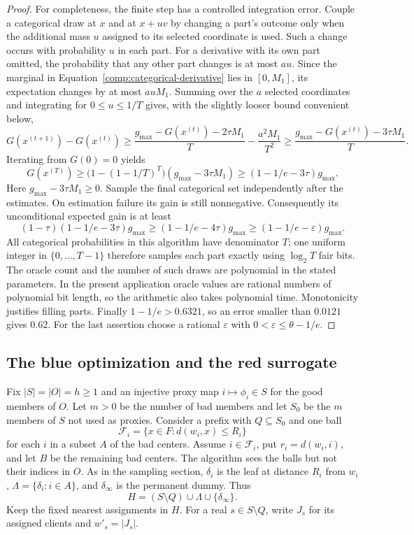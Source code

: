 \begin{proof}
For completeness, the finite step has a controlled integration error.
Couple a categorical draw at $x$ and at $x+uv$ by changing a part's
outcome only when the additional mass $u$ assigned to its selected
coordinate is used.  Such a change occurs with probability $u$ in each
part.  For a derivative with its own part omitted, the probability that
any other part changes is at most $au$.  Since the marginal in
Equation~\eqref{comp:categorical-derivative} lies in $[0,M_1]$, its
expectation changes by at most $auM_1$.  Summing over the $a$ selected
coordinates and integrating for $0\le u\le1/T$ gives, with the slightly
looser bound convenient below,
\[
 G(x^{(t+1)})-G(x^{(t)})
 \ge\frac{g_{\max}-G(x^{(t)})-2\tau M_1}{T}
       -\frac{a^2M_1}{T^2}
 \ge\frac{g_{\max}-G(x^{(t)})-3\tau M_1}{T}.
\]
Iterating from $G(0)=0$ yields
\[
 G(x^{(T)})\ge
 \bigl(1-(1-1/T)^T\bigr)(g_{\max}-3\tau M_1)
 \ge(1-1/e-3\tau)g_{\max}.
\]
Here $g_{\max}-3\tau M_1\ge0$.  Sample the final categorical set
independently after the estimates.  On estimation failure its gain is
still nonnegative.  Consequently its unconditional expected gain is at
least
\[
 (1-\tau)(1-1/e-3\tau)g_{\max}
 \ge(1-1/e-4\tau)g_{\max}
 \ge(1-1/e-\varepsilon)g_{\max}.
\]
All categorical probabilities in this algorithm have denominator $T$;
one uniform integer in $\{0,\ldots,T-1\}$ therefore samples each part
exactly using $\log_2T$ fair bits.  The oracle count and the number of
such draws are polynomial in the stated parameters.  In the present
application oracle values are rational numbers of polynomial bit
length, so the arithmetic also takes polynomial time.  Monotonicity
justifies filling parts.  Finally $1-1/e>0.6321$, so an error smaller
than $0.0121$ gives $0.62$.  For the last assertion choose a rational
$\varepsilon$ with $0<\varepsilon\le\theta-1/e$.
\end{proof}

\subsection{The blue optimization and the red surrogate}

Fix $|S|=|O|=h\ge1$ and an injective proxy map $i\mapsto\phi_i\in S$
for the good members of $O$.  Let $m>0$ be the number of bad members and
let $S_0$ be the $m$ members of $S$ not used as proxies.  Consider a
prefix with $Q\subseteq S_0$ and one ball
\[
 \mathcal F_i=\{x\in F:d(w_i,x)\le R_i\}
\]
for each $i$ in a subset $A$ of the bad centers.  Assume $i\in\mathcal F_i$,
put $r_i=d(w_i,i)$, and let $B$ be the remaining bad centers.  The
algorithm sees the balls but not their indices in $O$.  As in the
sampling section, $\delta_i$ is the leaf at distance $R_i$ from $w_i$,
$\Lambda=\{\delta_i:i\in A\}$, and $\delta_\infty$ is the permanent
dummy.  Thus
\[
 H=(S\setminus Q)\cup\Lambda\cup\{\delta_\infty\}.
\]
Keep the fixed nearest assignments in $H$.  For a real $s\in S\setminus Q$,
write $J_s$ for its assigned clients and $w'_s=|J_s|$.

